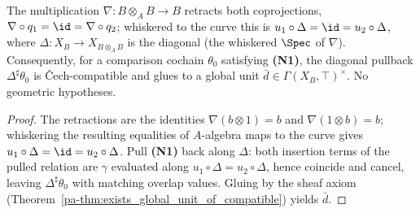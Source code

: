 \begin{theorem}
  \label{pa-thm:exists_glued_diagonalSeed}
  \leanok

  The multiplication \(\nabla \colon B \otimes_A B \to B\) retracts both coprojections, \(\nabla
  \circ q_1 = \id = \nabla \circ q_2\); whiskered to the curve this is \(u_1 \circ \Delta = \id =
  u_2 \circ \Delta\), where \(\Delta \colon X_B \to X_{B \otimes_A B}\) is the diagonal (the
  whiskered \(\Spec\) of \(\nabla\)). Consequently, for a comparison cochain \(\theta_0\) satisfying
  \textbf{(N1)}, the diagonal pullback \(\Delta^{\sharp}\theta_0\) is \v Cech-compatible and glues to
  a global unit \(\bar d \in \Gamma(X_B, \top)^{\times}\). No geometric hypotheses.
\end{theorem}
\begin{proof}
  \leanok
  The retractions are the identities \(\nabla(b \otimes 1) = b\) and \(\nabla(1 \otimes b) = b\);
  whiskering the resulting equalities of \(A\)-algebra maps to the curve gives \(u_1 \circ \Delta =
  \id = u_2 \circ \Delta\). Pull \textbf{(N1)} back along \(\Delta\): both insertion terms of the
  pulled relation are \(\gamma\) evaluated along \(u_1 \circ \Delta = u_2 \circ \Delta\), hence
  coincide and cancel, leaving \(\Delta^{\sharp}\theta_0\) with matching overlap values. Gluing by
  the sheaf axiom (Theorem~\ref{pa-thm:exists_global_unit_of_compatible}) yields \(\bar d\).
\end{proof}

